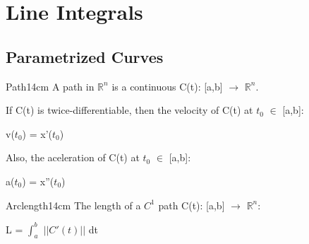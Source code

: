 \newpage

\section[Day 5: Line Integrals]{ Line Integrals }

\subsection{ Parametrized Curves }

    \begin{definition}{Path}{14cm}
        A {\color{lblue} path} in $\mathbb{R}^n$ is a continuous
        C(t): [a,b] $\rightarrow$ $\mathbb{R}^n$.

        \vspace{0.3cm}
        If C(t) is twice-differentiable, then the
        {\color{lblue} velocity} of C(t) at $t_0$ $\in$ [a,b]:

        \hspace{0.5cm}
        v($t_0$) = x'($t_0$)
        
        Also, the aceleration of C(t) at $t_0$ $\in$ [a,b]:

        \hspace{0.5cm}
        a($t_0$) = x''($t_0$)
    \end{definition}

    \vspace{0.5cm}



    \begin{definition}{Arclength}{14cm}
        The length of a $C^1$ path C(t): [a,b] $\rightarrow$ $\mathbb{R}^n$:

        \hspace{0.5cm}
        L = $\int_a^b$ $||C'(t)||$ dt
    \end{definition}

